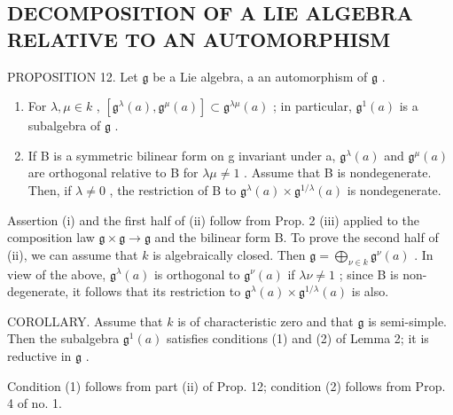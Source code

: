 \subsection{DECOMPOSITION OF A LIE ALGEBRA RELATIVE TO AN AUTOMORPHISM}

PROPOSITION 12. Let \(\mathfrak{g}\) be a Lie algebra, a an automorphism of \(\mathfrak{g}\) .

\begin{enumerate}
\def\labelenumi{(\roman{enumi})}
\item
  For \(\lambda, \mu \in k\) , \([\mathfrak{g}^{\lambda}(a), \mathfrak{g}^{\mu}(a)] \subset \mathfrak{g}^{\lambda \mu}(a)\) ; in particular, \(\mathfrak{g}^1(a)\) is a subalgebra of \(\mathfrak{g}\) .
\item
  If B is a symmetric bilinear form on g invariant under a, \(\mathfrak{g}^{\lambda}(a)\) and \(\mathfrak{g}^{\mu}(a)\) are orthogonal relative to B for \(\lambda\mu \neq 1\) . Assume that B is nondegenerate. Then, if \(\lambda \neq 0\) , the restriction of B to \(\mathfrak{g}^{\lambda}(a) \times \mathfrak{g}^{1/\lambda}(a)\) is nondegenerate.
\end{enumerate}

Assertion (i) and the first half of (ii) follow from Prop. 2 (iii) applied to the composition law \(\mathfrak{g} \times \mathfrak{g} \to \mathfrak{g}\) and the bilinear form B. To prove the second half of (ii), we can assume that \(k\) is algebraically closed. Then \(\mathfrak{g} = \bigoplus_{\nu \in k} \mathfrak{g}^{\nu}(a)\) . In view of the above, \(\mathfrak{g}^{\lambda}(a)\) is orthogonal to \(\mathfrak{g}^{\nu}(a)\) if \(\lambda \nu \neq 1\) ; since B is non-degenerate, it follows that its restriction to \(\mathfrak{g}^{\lambda}(a) \times \mathfrak{g}^{1/\lambda}(a)\) is also.

COROLLARY. Assume that \(k\) is of characteristic zero and that \(\mathfrak{g}\) is semi-simple. Then the subalgebra \(\mathfrak{g}^1(a)\) satisfies conditions (1) and (2) of Lemma 2; it is reductive in \(\mathfrak{g}\) .

Condition (1) follows from part (ii) of Prop. 12; condition (2) follows from Prop. 4 of no. 1.

